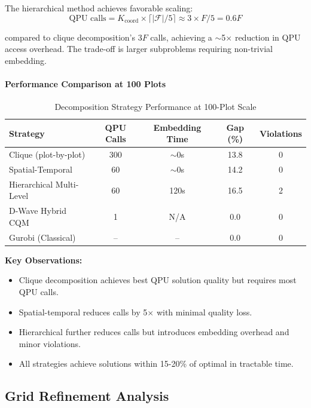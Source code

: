 \documentclass{oqireport}
\begin{document}
The hierarchical method achieves favorable scaling:
\begin{equation}
\text{QPU calls} = K_{\text{coord}} \times \lceil |\mathcal{F}| / 5 \rceil \approx 3 \times F/5 = 0.6F
\end{equation}

compared to clique decomposition's $3F$ calls, achieving a $\sim$5$\times$ reduction in QPU access overhead. The trade-off is larger subproblems requiring non-trivial embedding.

\paragraph{Performance Comparison at 100 Plots}

\begin{table}[H]
\centering
\caption{Decomposition Strategy Performance at 100-Plot Scale}
\label{tab:strategy_comparison}
\small
\begin{tabular}{lcccc}
\toprule
\textbf{Strategy} & \textbf{QPU Calls} & \textbf{Embedding Time} & \textbf{Gap (\%)} & \textbf{Violations} \\
\midrule
Clique (plot-by-plot) & 300 & $\sim$0s & 13.8 & 0 \\
Spatial-Temporal & 60 & $\sim$0s & 14.2 & 0 \\
Hierarchical Multi-Level & 60 & 120s & 16.5 & 2 \\
\midrule
D-Wave Hybrid CQM & 1 & N/A & 0.0 & 0 \\
Gurobi (Classical) & -- & -- & 0.0 & 0 \\
\bottomrule
\end{tabular}
\end{table}

\textbf{Key Observations:}
\begin{itemize}
\item Clique decomposition achieves best QPU solution quality but requires most QPU calls.
\item Spatial-temporal reduces calls by 5$\times$ with minimal quality loss.
\item Hierarchical further reduces calls but introduces embedding overhead and minor violations.
\item All strategies achieve solutions within 15-20\% of optimal in tractable time.
\end{itemize}


\subsection{Grid Refinement Analysis}\label{app:refinement}
\end{document}
